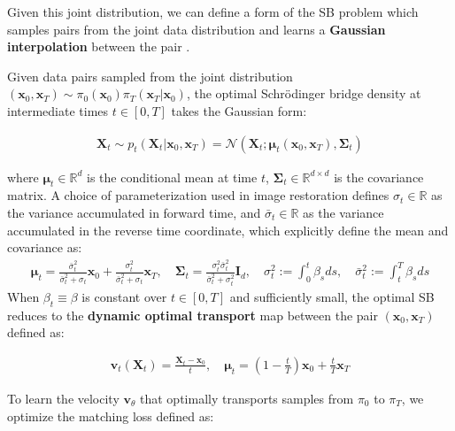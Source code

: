 \documentclass{article}
\begin{document}
Given this joint distribution, we can define a form of the SB problem which samples pairs from the joint data distribution and learns a \textbf{Gaussian interpolation} between the pair \citep{liu20232}. 
\begin{definition}\label{def:data-translation}
    Given data pairs sampled from the joint distribution $(\boldsymbol{x}_0, \boldsymbol{x}_T)\sim \pi_0(\boldsymbol{x}_0)\pi_T(\boldsymbol{x}_T|\boldsymbol{x}_0)$, the optimal Schrödinger bridge density at intermediate times $t\in [0,T]$ takes the Gaussian form:
    \begin{small}
    \begin{align}
        \boldsymbol{X}_t \sim p_t(\boldsymbol{X}_t|\boldsymbol{x}_0, \boldsymbol{x}_T)=\mathcal{N}(\boldsymbol{X}_t;\boldsymbol{\mu}_t(\boldsymbol{x}_0, \boldsymbol{x}_T), \boldsymbol{\Sigma}_t)
    \end{align}
    \end{small}
    where $\boldsymbol{\mu}_t\in \mathbb{R}^d$ is the conditional mean at time $t$, $\boldsymbol{\Sigma}_t\in \mathbb{R}^{d\times d}$ is the covariance matrix. A choice of parameterization used in image restoration \citep{liu20232} defines $\sigma_t\in \mathbb{R}$ as the variance accumulated in forward time, and $\bar{\sigma}_t\in \mathbb{R}$ as the variance accumulated in the reverse time coordinate, which explicitly define the mean and covariance as:
    \begin{align}
        \boldsymbol{\mu}_t=\frac{\bar{\sigma}_t^2}{\bar{\sigma}_t^2+\sigma_t}\boldsymbol{x}_0+\frac{\sigma_t^2}{\bar{\sigma}_t^2+\sigma_t}\boldsymbol{x}_T, \quad \boldsymbol{\Sigma}_t=\frac{\sigma^2_t\bar{\sigma}_t^2}{\bar{\sigma}_t^2+\sigma_t^2}\boldsymbol{I}_d, \quad \sigma_t^2:=\int_0^t\beta_sds, \quad \bar{\sigma}_t^2:=\int_t^T\beta_sds
    \end{align}
    When $\beta_t\equiv \beta$ is constant over $t\in [0,T]$ and sufficiently small, the optimal SB reduces to the \textbf{dynamic optimal transport} map between the pair $(\boldsymbol{x}_0, \boldsymbol{x}_T)$ defined as:
    \begin{small}
    \begin{align}
        \boldsymbol{v}_t(\boldsymbol{X}_t)=\frac{\boldsymbol{X}_t-\boldsymbol{x}_0}{t}, \quad \boldsymbol{\mu}_t=\left(1-\frac{t}{T}\right)\boldsymbol{x}_0+\frac{t}{T}\boldsymbol{x}_T
    \end{align}
    \end{small}
    To learn the velocity $\boldsymbol{v}_\theta$ that optimally transports samples from $\pi_0$ to $\pi_T$, we optimize the matching loss defined as:

\end{definition}
\end{document}
